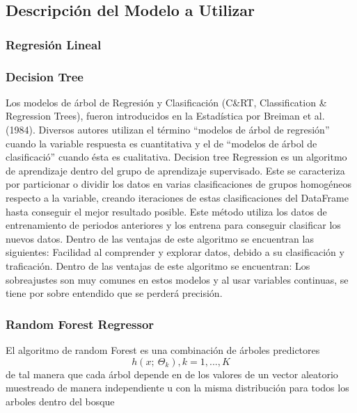 \subsection{Descripci\'on del Modelo a Utilizar}

\subsubsection{Regresi\'on Lineal}

\subsubsection{Decision Tree}
Los modelos de \'arbol de Regresi\'on y Clasificaci\'on (C&RT, Classification & Regression Trees), fueron introducidos en la Estad\'istica por Breiman et al. (1984). Diversos autores utilizan el t\'ermino ``modelos de \'arbol de regresi\'on'' cuando la variable respuesta es cuantitativa y el de ``modelos de \'arbol de clasificaci\'o'' cuando \'esta es cualitativa. 
Decision tree Regression es un algoritmo de aprendizaje dentro del grupo de aprendizaje supervisado. Este se caracteriza por particionar o dividir los datos en varias clasificaciones de grupos homog\'eneos respecto a la variable, creando iteraciones de estas clasificaciones del DataFrame hasta conseguir el mejor resultado posible. Este m\'etodo utiliza los datos de entrenamiento de periodos anteriores y los entrena para conseguir clasificar los nuevos datos.
Dentro de las ventajas de este algoritmo se encuentran las siguientes:
Facilidad al comprender y explorar datos, debido a su clasificaci\'on y traficaci\'on. 
Dentro de las ventajas de este algoritmo se encuentran:
Los sobreajustes son muy comunes en estos modelos y al usar variables continuas, se tiene por sobre entendido que se perder\'a precisi\'on.

\subsubsection{Random Forest Regressor}
El algoritmo de random Forest es una combinaci\'on de \'arboles predictores \begin{equation}
    h\left ( x;\ \Theta _{k} \right ), k=1, ..., K
\end{equation} 
de tal manera que cada \'arbol depende en de los valores de un vector aleatorio muestreado de manera independiente u con la misma distribuci\'on para todos los arboles dentro del bosque \cite{breiman2001random}

